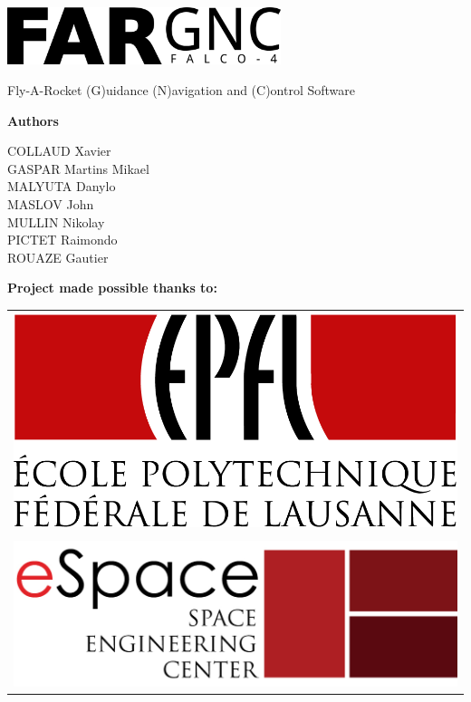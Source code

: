\documentclass[twoside]{book}
\newlength{\logolength}
\begin{document}
\hypersetup{pageanchor=false}
\begin{titlepage}

\begin{center}%

\vspace{2cm}

\includegraphics[width=0.6\textwidth]{../../doc/images/Logo_large.png}

\vspace*{1cm}

{\Large Fly-A-Rocket (G)uidance (N)avigation and (C)ontrol Software }\\
\vspace*{1cm}

\textbf{Authors}

COLLAUD Xavier\\
GASPAR Martins Mikael\\
MALYUTA Danylo\\
MASLOV John\\
MULLIN Nikolay\\
PICTET Raimondo\\
ROUAZE Gautier

\vspace{1cm}

\textbf{Project made possible thanks to:}

\vspace{0.3cm}

\def\arraystretch{1.5}
\begin{tabular}{m{\logolength}}
	\includegraphics[width=\logolength]{../../doc/images/EPFL.png} \\
	\\
	\includegraphics[width=\logolength]{../../doc/images/eSpace.jpg} \\
\end{tabular}


\end{center}
\end{titlepage}
\end{document}
